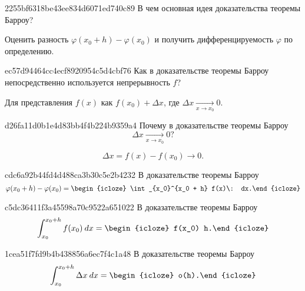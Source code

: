 \begin{note}{2255bf6318be43ee834d6071ed740c89}
    В чем основная идея доказательства теоремы Барроу?

    \begin{cloze}{1}
        Оценить разность \({ \varphi(x_0 + h) - \varphi(x_0) }\) и получить дифференцируемость \({ \varphi }\) по определению.
    \end{cloze}
\end{note}

\begin{note}{ec57d94464cc4ecf8920954c5d4cbf76}
    Как в доказательстве теоремы Барроу непосредственно используется непрерывность \({ f }\)?

    \begin{cloze}{1}
        Для представления \({ f(x) }\) как \({ f(x_0) + \Delta x }\), где \({ \Delta x \underset{x \to x_0}\longrightarrow 0 }\).
    \end{cloze}
\end{note}

\begin{note}{d26fa11d0b1e4d83bb4f4b224b9359a4}
    Почему в доказательстве теоремы Барроу
    \[
        \Delta  x \underset{x \to x_0}\longrightarrow 0?
    \]

    \begin{cloze}{1}
        \[
            \Delta x = f(x) - f(x_0) \to 0.
        \]
    \end{cloze}
\end{note}

\begin{note}{cdc6a92b44fd4d488ca3b30c5e2b4232}
    В доказательстве теоремы Барроу
    \[
        \varphi(x_0 + h) - \varphi(x_0) = \begin{icloze}{1}\int_{x_0}^{x_0 + h} f(x)\: dx.\end{icloze}
    \]
\end{note}

\begin{note}{c5dc36411f3a45598a70c9522a651022}
    В доказательстве теоремы Барроу
    \[
        \int_{x_0}^{x_0 + h} f(x_0)\: dx = \begin{icloze}{1}f(x_0) h.\end{icloze}
    \]
\end{note}

\begin{note}{1cea51f7fd9b4b438856a6ec7f4c1a48}
    В доказательстве  теоремы  Барроу
    \[
        \int_{x_0}^{x_0 + h} \Delta x\: dx = \begin{icloze}{1}o(h).\end{icloze}
    \]
\end{note}

